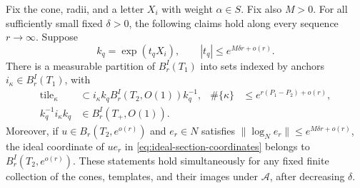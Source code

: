 \begin{lemma}
\label{lem:strict-width-tiling}
Fix the cone, radii, and a letter $X_i$ with weight $\alpha\in S$.
Fix also $M>0$.  For all sufficiently small fixed $\delta>0$, the following
claims hold along every sequence $r\to\infty$.  Suppose
\[
 k_q=\exp(t_qX_i),\qquad |t_q|\le e^{M\delta r+o(r)}.
\]
There is a measurable partition of $B^I_r(T_1)$ into sets indexed by anchors
$i_\kappa\in B^I_r(T_1)$, with
\begin{align}
 \text{tile}_\kappa&\subset i_\kappa k_q B^I_r(T_2,O(1))k_q^{-1},
 &\#\{\kappa\}&\le e^{r(P_1-P_2)+o(r)},
 \label{eq:cone-tiles}\\
 k_q^{-1}i_\kappa k_q&\in B^I_r(T_+,O(1)).
 \label{eq:cone-anchor}
\end{align}
Moreover, if $u\in B_r(T_2,e^{o(r)})$ and $e_r\in N$ satisfies
$\|\log_N e_r\|\le e^{M\delta r+o(r)}$, the ideal coordinate of $ue_r$ in
\eqref{eq:ideal-section-coordinates} belongs to
$B^I_r(T_2,e^{o(r)})$.  These statements hold simultaneously for any fixed
finite collection of the cones, templates, and their images under
$\mathcal A$, after decreasing $\delta$.
\end{lemma}

